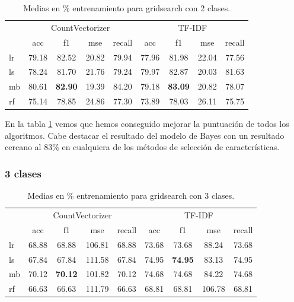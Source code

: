 \begin{table}[H]
	\centering
	\begin{tabular}{|l|cccc|cccc|}
		\hline
		& \multicolumn{4}{c|}{CountVectorizer} & \multicolumn{4}{c|}{TF-IDF} \\
		\cline{2-9}
		&    acc &     f1 &    mse &  recall & acc &     f1 &    mse &  recall \\
		\hline
		lr      &  79.18 &  82.52 &  20.82 &   79.94 &  77.96 &  81.98 &  22.04 &   77.56 \\
		ls      &  78.24 &  81.70 &  21.76 &   79.24 &  79.97 &  82.87 &  20.03 &   81.63 \\
		mb      &  80.61 &  \textbf{82.90} &  19.39 &   84.20 &  79.18 &  \textbf{83.09} &  20.82 &   78.07 \\
		rf      &  75.14 &  78.85 &  24.86 &   77.30 &  73.89 &  78.03 &  26.11 &   75.75 \\
		\hline
	\end{tabular}
	\caption{Medias en \% entrenamiento para gridsearch con 2 clases.}
	\label{result-cv-kf}
\end{table}

En la tabla \ref{result-cv-kf} vemos que hemos conseguido mejorar la puntuación de todos los algoritmos. Cabe destacar el resultado del modelo de Bayes con un resultado cercano al 83\% en cualquiera de los métodos de selección de características.

\subsubsection{3 clases}

\begin{table}[H]
	\centering
	\begin{tabular}{|l|cccc|cccc|}
		\hline
		& \multicolumn{4}{c|}{CountVectorizer} & \multicolumn{4}{c|}{TF-IDF} \\
		\cline{2-9}
		&    acc &     f1 &    mse &  recall & acc &     f1 &    mse &  recall \\
		\hline
		lr      &  68.88 &  68.88 &  106.81 &   68.88 &  73.68 &  73.68 &   88.24 &   73.68 \\
		ls      &  67.84 &  67.84 &  111.58 &   67.84 &  74.95 &  \textbf{74.95} &   83.13 &   74.95 \\
		mb      &  70.12 &  \textbf{70.12} &  101.82 &   70.12 &  74.68 &  74.68 &   84.22 &   74.68 \\
		rf      &  66.63 &  66.63 &  111.79 &   66.63&  68.81 &  68.81 &  106.78 &   68.81 \\
		\hline
	\end{tabular}
	\caption{Medias en \% entrenamiento para gridsearch con 3 clases.}
	\label{result-cv-kf-3-clases}
\end{table}


